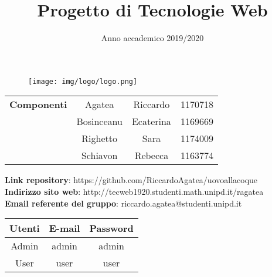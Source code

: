 
\title{Progetto di Tecnologie Web}
\author{}
\date{Anno accademico 2019/2020}


	\maketitle
	\begin{figure}[H]
		\centering
		\texttt{[image: img/logo/logo.png]}
	\end{figure}
	\begin{table}[H]
		\centering
		\begin{tabular}{c|c c c}
			\textbf{Componenti}&Agatea&Riccardo&1170718\\
			&Bosinceanu&Ecaterina&1169669\\
			&Righetto&Sara&1174009\\
			&Schiavon&Rebecca&1163774\\
		\end{tabular}
	\end{table}

	\begin{center}
		\textbf{Link repository}: https://github.com/RiccardoAgatea/uovoallacoque\\
		\textbf{Indirizzo sito web}: http://tecweb1920.studenti.math.unipd.it/ragatea\\
		\textbf{Email referente del gruppo}: riccardo.agatea@studenti.unipd.it
	\end{center}

	\begin{table}[H]
		\centering
		\begin{tabular}{c|c c}
			\textbf{Utenti} & \textbf{E-mail} & \textbf{Password} \\
			\hline
			Admin & admin & admin \\
			User & user & user \\
		\end{tabular}
	\end{table}
	\newpage
	\tableofcontents
	\newpage
	\renewcommand{\abstractname}{Abstract}
	\begin{abstract}
		
	\end{abstract}
	\newpage
	
	
	
	
